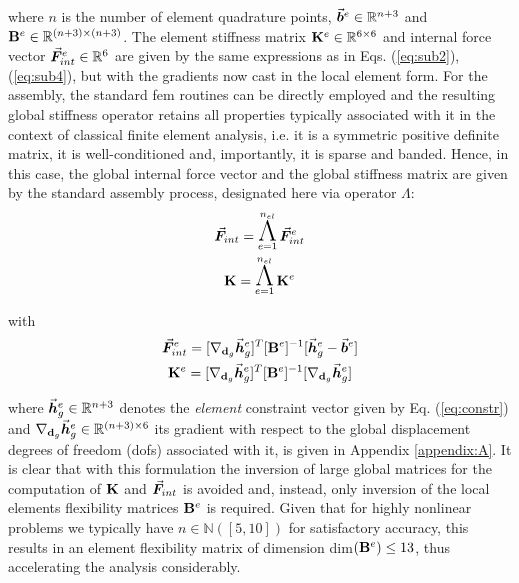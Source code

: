 \noindent where $n$ is the number of element quadrature points,
$\vec{\boldsymbol{b}}^e\in\mathbb{R}^{n+3}$ and $\mathbf{B}^e\in\mathbb{R}^{(n+3)\times 
(n+3)}$. 
The element stiffness matrix $\mathbf{K}^e\in\mathbb{R}^{6\times 6}$ and 
internal force vector $\vec{\boldsymbol{F}}_{int}^e\in\mathbb{R}^{6}$ are given by the same
expressions as in Eqs. (\ref{eq:sub2}), (\ref{eq:sub4}), but with the gradients
now cast in the local element form. For the assembly,
the standard \acrshort{fem} routines can be directly employed and the resulting 
global 
stiffness operator retains all properties typically associated with it in the 
context of classical finite element analysis, i.e. it is a symmetric positive 
definite matrix, it is well-conditioned and, importantly, it is sparse and
banded. Hence, in this case, the global internal force vector and the global 
stiffness matrix are given by the standard assembly process, designated here 
via operator {\large $\Lambda$}:
\begin{gather}
	\bvec{F}_{int} =\Assem_{e=1}^{n_{el}} \bvec{F}_{int}^e\label{eq:Fassemb}\\ 
	\bmat{K} = \Assem_{e=1}^{n_{el}} \bmat{K}^e
	\label{eq:assembly}
\end{gather}

with
\begin{gather}
	\vec{\boldsymbol{F}}_{int}^e =
	[\nabla_{\mathbf{d}_g}\vec{\boldsymbol{h}}_g^e]^T[\mathbf{B}^e]^{-1}[\vec{\boldsymbol{h}}_{g}^e-\vec{\boldsymbol{b}}^e]\label{eq:localforce}\\
	\mathbf{K}^e
	=[\nabla_{\mathbf{d}_g}\vec{\boldsymbol{h}}_g^e]^T[\mathbf{B}^e]^{-1}[\nabla_{\mathbf{d}_g}\vec{\boldsymbol{h}}_g^e]
	\label{eq:localstiff}
\end{gather}

\noindent where $\vec{\boldsymbol{h}}_g^e\in\mathbb{R}^{n+3}$ denotes 
the \textit{element} constraint vector given by Eq. (\ref{eq:constr}) and
$\nabla_{\mathbf{d}_g}\vec{\boldsymbol{h}}_g^e\in\mathbb{R}^{(n+3)\times 6}$ its
gradient with respect to the global displacement degrees of freedom 
(\acrshort{dof}s)
associated with it, is given in Appendix \ref{appendix:A}. It is clear that 
with this formulation the inversion of large global 
matrices for
the computation of $\mathbf{K}$ and $\vec{\boldsymbol{F}}_{int}$ is avoided and, instead, 
only 
inversion of the local elements flexibility matrices $\mathbf{B}^e$ is required.
Given that for highly nonlinear problems we typically 
have $n\in\mathbb{N}([5,10])$ for satisfactory accuracy, this
results in an element flexibility matrix of dimension dim$(\mathbf{B}^e)\leq 13$,
thus accelerating the analysis considerably. 

